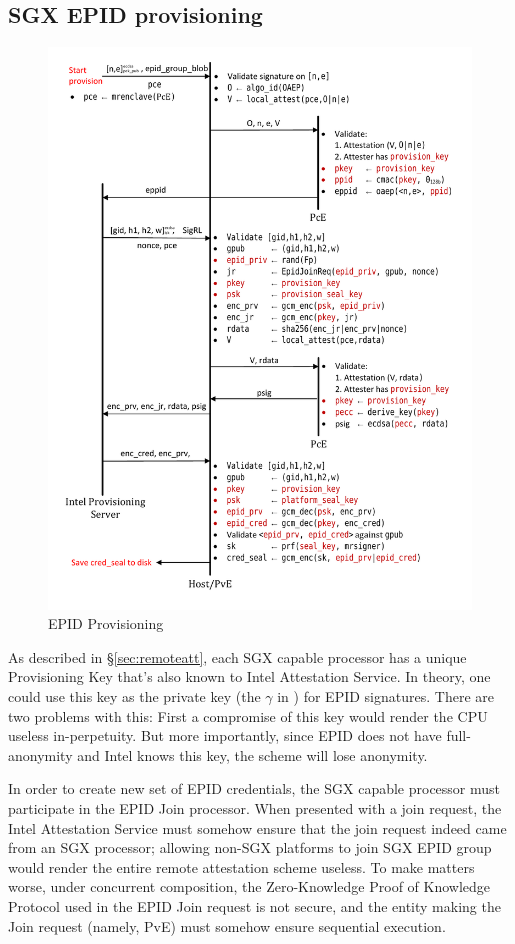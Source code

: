 \documentclass[letterpaper]{article}
\newcommand{\secref}[1]{\S\ref{#1}}
\newcommand{\pve}{\textsf{PvE}}
\begin{document}
  \subsection{SGX EPID provisioning}
  \label{ssec:epidprov}
  \begin{figure}
  \centering
  \includegraphics[width=0.8\linewidth]{Diagrams/EpidProvisioning}
  \caption{EPID Provisioning}
  \label{fig:epidprov}
  \end{figure}

  As described in \secref{sec:remoteatt}, each SGX capable processor
  has a unique Provisioning Key that's also known to Intel Attestation
  Service. In theory, one could use this key as the private key (the
  $\gamma$ in \cite{epid}) for EPID signatures. There are two problems
  with this: First a compromise of this key would render the CPU
  useless in-perpetuity. But more importantly, since EPID does not
  have full-anonymity and Intel knows this key, the scheme will lose
  anonymity.

  In order to create new set of EPID credentials, the SGX capable
  processor must participate in the EPID Join processor. When
  presented with a join request, the Intel Attestation Service must
  somehow ensure that the join request indeed came from an SGX
  processor; allowing non-SGX platforms to join SGX EPID group would
  render the entire remote attestation scheme useless. To make matters
  worse, under concurrent composition, the Zero-Knowledge Proof of
  Knowledge Protocol used in the EPID Join request is not secure, and
  the entity making the Join request (namely, \pve) must somehow
  ensure sequential execution.
\end{document}
